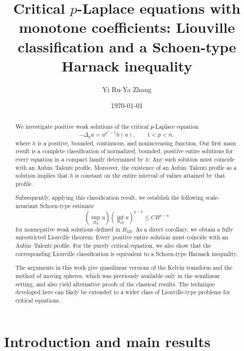 \documentclass[reqno,12pt]{amsart}
\title[Liouville classification and Harnack inequalities]
{Critical $p$-Laplace equations with monotone coefficients: Liouville classification and a Schoen-type Harnack inequality}
\author{Yi Ru-Ya Zhang}
\date{\today}
\numberwithin{equation}{section}
\theoremstyle{remark}
\begin{document}
\begin{abstract}
We investigate positive weak solutions of the critical $p$-Laplace equation
$$
 -\Delta_p u = u^{p^*-1} h(u), \qquad 1 < p < n,
$$
where $h$ is a positive, bounded, continuous, and nonincreasing function. Our first main result is a complete classification of normalized, bounded, positive entire solutions for every equation in a compact family determined by $h$: Any such solution must coincide with an Aubin--Talenti profile. Moreover, the existence of an Aubin--Talenti profile as a solution implies that $h$ is constant on the entire interval of values attained by that profile. 

Subsequently, applying this classification result, we establish the following scale-invariant Schoen-type estimate
$$
 \left(\sup_{B_R} u\right)\left(\inf_{B_{2R}} u\right)^{p-1}
 \le C R^{p-n}
$$
for nonnegative weak solutions defined in $B_{3R}$. As a direct corollary, we obtain a fully unrestricted Liouville theorem: Every positive entire solution must coincide with an Aubin--Talenti profile. For the purely critical equation, we also show that the corresponding Liouville classification is equivalent to a Schoen-type Harnack inequality. 

The arguments in this work give quasilinear versions of the Kelvin transform and the method of moving spheres, which was previously available only in the semilinear setting, and also yield alternative proofs of the classical results. The technique developed here can likely be extended to a wider class of Liouville-type problems for critical equations.
\end{abstract}


\maketitle


\section{Introduction and main results}
\label{sec:introduction}
\end{document}
